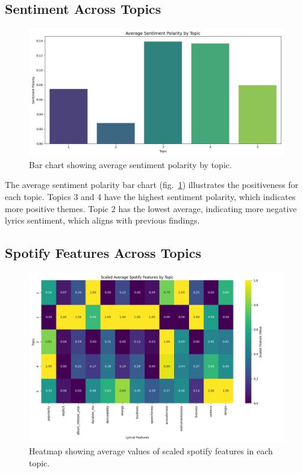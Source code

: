 \subsection{Sentiment Across Topics}
\begin{center}
\begin{figure}[H]
  \centering
  \includegraphics[width=6in]{img/lda_sentiment.png}
  \caption{Bar chart showing average sentiment polarity by topic.}
  \label{Figure:lda_sentiment}
\end{figure}
\end{center}

The average sentiment polarity bar chart (fig.~\ref{Figure:lda_sentiment}) illustrates the positiveness for each
topic. Topics 3 and 4 have the highest sentiment polarity, which indicates more
positive themes. Topic 2 has the lowest average, indicating more negative
lyrics sentiment, which aligns with previous findings.

\subsection{Spotify Features Across Topics}

\begin{center}
\begin{figure}[H]
  \centering
  \includegraphics[width=6in]{img/lda_spotify_features.png}
  \caption{Heatmap showing average values of scaled spotify features in each
  topic.}
  \label{Figure:lda_spotify_features}
\end{figure}
\end{center}

